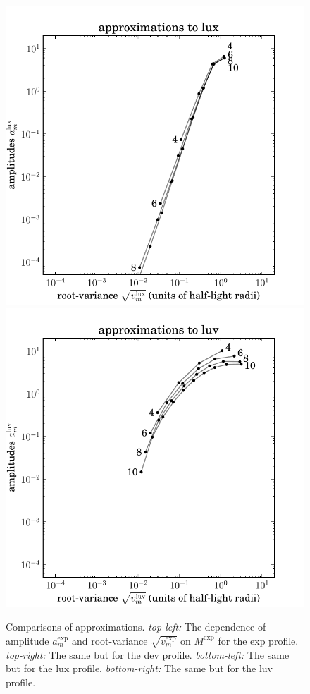 \documentclass[12pt,pdftex,preprint]{aastex}
\newlength{\figurewidth}
\begin{document}
\begin{figure}
\includegraphics[width=\figurewidth]{mixtures_vs_K_lux.pdf}%
\includegraphics[width=\figurewidth]{mixtures_vs_K_luv.pdf}
\caption{Comparisons of approximations.  \textsl{top-left:} The
  dependence of amplitude $a^{\exp}_m$ and root-variance
  $\sqrt{v^{\exp}_m}$ on $M^{\exp}$ for the exp profile.
  \textsl{top-right:} The same but for the dev profile.
  \textsl{bottom-left:} The same but for the lux profile.
  \textsl{bottom-right:} The same but for the luv profile.\label{fig:M}}
\end{figure}
\end{document}
